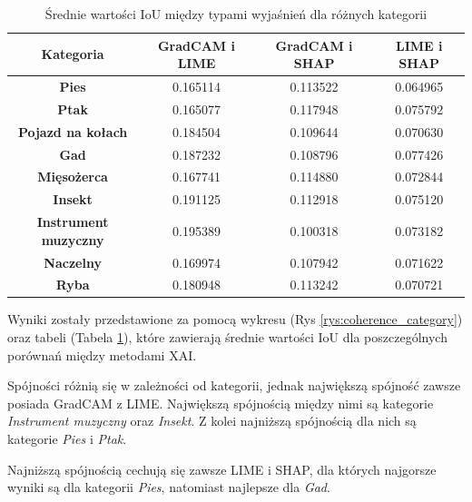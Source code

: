 \begin{table}[h]
	\centering
	\begin{tabular}{|c|c|c|c|}
		\hline
		\textbf{Kategoria}           & \textbf{GradCAM i LIME} & \textbf{GradCAM i SHAP} & \textbf{LIME i SHAP} \\
		\hline
		\textbf{Pies}                & 0.165114                & 0.113522                & 0.064965             \\
		\hline
		\textbf{Ptak}                & 0.165077                & 0.117948                & 0.075792             \\
		\hline
		\textbf{Pojazd na kołach}    & 0.184504                & 0.109644                & 0.070630             \\
		\hline
		\textbf{Gad}                 & 0.187232                & 0.108796                & 0.077426             \\
		\hline
		\textbf{Mięsożerca}          & 0.167741                & 0.114880                & 0.072844             \\
		\hline
		\textbf{Insekt}              & 0.191125                & 0.112918                & 0.075120             \\
		\hline
		\textbf{Instrument muzyczny} & 0.195389                & 0.100318                & 0.073182             \\
		\hline
		\textbf{Naczelny}            & 0.169974                & 0.107942                & 0.071622             \\
		\hline
		\textbf{Ryba}                & 0.180948                & 0.113242                & 0.070721             \\
		\hline
	\end{tabular}
	\caption{Średnie wartości IoU między typami wyjaśnień dla różnych kategorii}
	\label{tab:base_coherence_categories}
\end{table}

Wyniki zostały przedstawione za pomocą wykresu (Rys \ref{rys:coherence_category}) oraz tabeli (Tabela \ref{tab:base_coherence_categories}), które zawierają średnie wartości IoU dla poszczególnych porównań między metodami XAI.

Spójności różnią się w zależności od kategorii, jednak największą spójność zawsze posiada GradCAM z LIME.
Największą spójnością między nimi są kategorie \textit{Instrument muzyczny} oraz \textit{Insekt}.
Z kolei najniższą spójnością dla nich są kategorie \textit{Pies} i \textit{Ptak}.

Najniższą spójnością cechują się zawsze LIME i SHAP, dla których najgorsze wyniki są dla kategorii \textit{Pies}, natomiast najlepsze dla \textit{Gad}.

